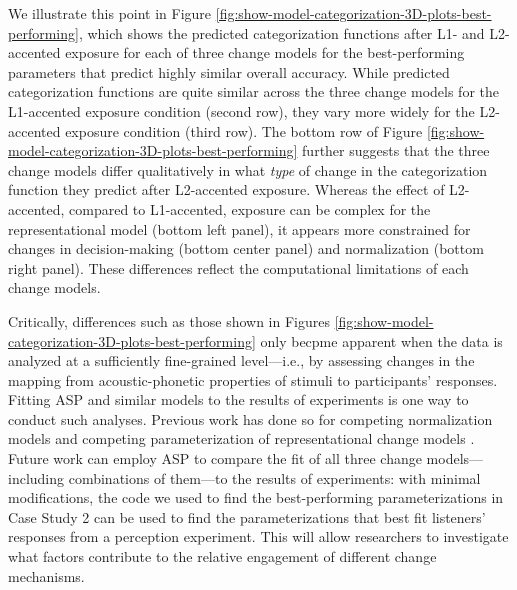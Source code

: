 \documentclass[
  11pt,
  man,floatsintext]{apa6}
\begin{document}
We illustrate this point in Figure \ref{fig:show-model-categorization-3D-plots-best-performing}, which shows the predicted categorization functions after L1- and L2-accented exposure for each of three change models for the best-performing parameters that predict highly similar overall accuracy. While predicted categorization functions are quite similar across the three change models for the L1-accented exposure condition (second row), they vary more widely for the L2-accented exposure condition (third row). The bottom row of Figure \ref{fig:show-model-categorization-3D-plots-best-performing} further suggests that the three change models differ qualitatively in what \emph{type} of change in the categorization function they predict after L2-accented exposure. Whereas the effect of L2-accented, compared to L1-accented, exposure can be complex for the representational model (bottom left panel), it appears more constrained for changes in decision-making (bottom center panel) and normalization (bottom right panel). These differences reflect the computational limitations of each change models.

Critically, differences such as those shown in Figures \ref{fig:show-model-categorization-3D-plots-best-performing} only becpme apparent when the data is analyzed at a sufficiently fine-grained level---i.e., by assessing changes in the mapping from acoustic-phonetic properties of stimuli to participants' responses. Fitting ASP and similar models to the results of experiments is one way to conduct such analyses. Previous work has done so for competing normalization models \autocites[see, e.g.,][]{mcmurray-jongman2011,apfelbaum-mcmurray2015,persson-jaeger2022,richter2017,xie2021cognition} and competing parameterization of representational change models \autocites[e.g.,][]{kleinschmidt-jaeger2016cogsci,kleinschmidt2020,tan2022}. Future work can employ ASP to compare the fit of all three change models---including combinations of them---to the results of experiments: with minimal modifications, the code we used to find the best-performing parameterizations in Case Study 2 can be used to find the parameterizations that best fit listeners' responses from a perception experiment. This will allow researchers to investigate what factors contribute to the relative engagement of different change mechanisms.
\end{document}
